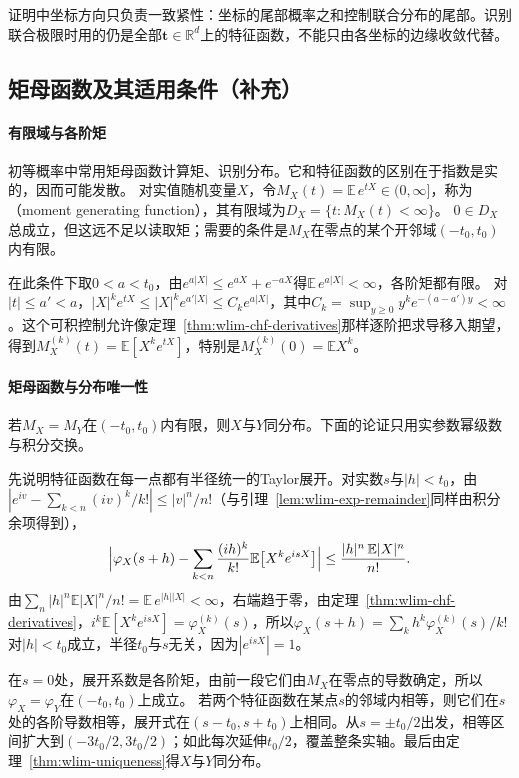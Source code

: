 证明中坐标方向只负责一致紧性：坐标的尾部概率之和控制联合分布的尾部。识别联合极限时用的仍是全部$\bm t\in\mathbb R^d$上的特征函数，不能只由各坐标的边缘收敛代替。

\subsection{矩母函数及其适用条件（补充）}

\paragraph{有限域与各阶矩}
初等概率中常用矩母函数计算矩、识别分布。它和特征函数的区别在于指数是实的，因而可能发散。
对实值随机变量$X$，令$M_X(t)=\mathbb E\,e^{tX}\in(0,\infty]$，称为（moment generating function），其有限域为$D_X=\{t:M_X(t)<\infty\}$。
$0\in D_X$总成立，但这远不足以读取矩；需要的条件是$M_X$在零点的某个开邻域$(-t_0,t_0)$内有限。

在此条件下取$0<a<t_0$，由$e^{a|X|}\leq e^{aX}+e^{-aX}$得$\mathbb E\,e^{a|X|}<\infty$，各阶矩都有限。
对$|t|\leq a'<a$，$|X|^ke^{tX}\leq|X|^ke^{a'|X|}\leq C_ke^{a|X|}$，其中$C_k=\sup_{y\geq0}y^ke^{-(a-a')y}<\infty$。这个可积控制允许像定理~\ref{thm:wlim-chf-derivatives}那样逐阶把求导移入期望，得到$M_X^{(k)}(t)=\mathbb E[X^ke^{tX}]$，特别是$M_X^{(k)}(0)=\mathbb E X^k$。

\paragraph{矩母函数与分布唯一性}
若$M_X=M_Y$在$(-t_0,t_0)$内有限，则$X$与$Y$同分布。下面的论证只用实参数幂级数与积分交换。

先说明特征函数在每一点都有半径统一的Taylor展开。对实数$s$与$|h|<t_0$，由$|e^{iv}-\sum_{k<n}(iv)^k/k!|\leq|v|^n/n!$（与引理~\ref{lem:wlim-exp-remainder}同样由积分余项得到），
\[
  \Bigl|\varphi_X(s+h)-\sum_{k<n}\frac{(ih)^k}{k!}\mathbb E\bigl[X^ke^{isX}\bigr]\Bigr|\leq\frac{|h|^n\,\mathbb E|X|^n}{n!}.
\]
由$\sum_n|h|^n\mathbb E|X|^n/n!=\mathbb E\,e^{|h||X|}<\infty$，右端趋于零，由定理~\ref{thm:wlim-chf-derivatives}，$i^k\mathbb E[X^ke^{isX}]=\varphi_X^{(k)}(s)$，所以$\varphi_X(s+h)=\sum_kh^k\varphi_X^{(k)}(s)/k!$对$|h|<t_0$成立，半径$t_0$与$s$无关，因为$|e^{isX}|=1$。

在$s=0$处，展开系数是各阶矩，由前一段它们由$M_X$在零点的导数确定，所以$\varphi_X=\varphi_Y$在$(-t_0,t_0)$上成立。
若两个特征函数在某点$s$的邻域内相等，则它们在$s$处的各阶导数相等，展开式在$(s-t_0,s+t_0)$上相同。从$s=\pm t_0/2$出发，相等区间扩大到$(-3t_0/2,3t_0/2)$；如此每次延伸$t_0/2$，覆盖整条实轴。最后由定理~\ref{thm:wlim-uniqueness}得$X$与$Y$同分布。

